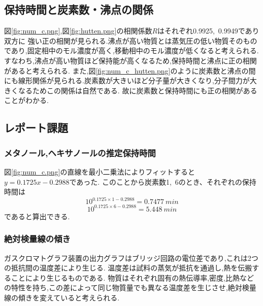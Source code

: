 \subsection{保持時間と炭素数・沸点の関係}
図\ref{fig:num_c.png},図\ref{fig:hutten.png}の相関係数$R$はそれぞれ0.9925,\ 0.9949であり双方に
強い正の相関が見られる.沸点が高い物質とは蒸気圧の低い物質そのものであり,固定相中のモル濃度が高く,移動相中のモル濃度が低くなると考えられる.
すなわち,沸点が高い物質ほど保持能が高くなるため,保持時間と沸点に正の相関があると考えられる.
また,図\ref{fig:num_c_hutten.png}のように炭素数と沸点の間にも線形関係が見られる.炭素数が大きいほど分子量が大きくなり,分子間力が大きくなるためこの関係は自然である.
故に炭素数と保持時間にも正の相関があることがわかる.
\subsection{レポート課題}
\subsubsection{メタノール,ヘキサノールの推定保持時間}
図\ref{fig:num_c.png}の直線を最小二乗法によりフィットすると$y=0.1725x-0.2988$であった.
このことから炭素数1,\ 6のとき、それぞれの保持時間は
$$10^{0.1725\times1-0.2988}=0.7477\ \si{min}$$
$$10^{0.1725\times6-0.2988}=5.448\ \si{min}$$
であると算出できる.
\subsubsection{絶対検量線の傾き}
ガスクロマトグラフ装置の出力グラフはブリッジ回路の電位差であり,これは2つの抵抗間の温度差により生じる.
温度差は試料の蒸気が抵抗を通過し,熱を伝搬することにより生じるものである.
物質はそれぞれ固有の熱伝導率,密度,比熱などの特性を持ち,この差によって同じ物質量でも異なる温度差を生じさせ,絶対検量線の傾きを変えていると考えられる.